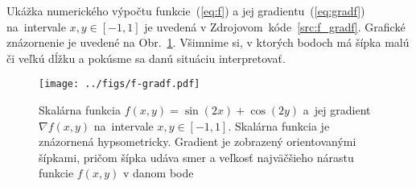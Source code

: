 \documentclass[a4paper, 12pt]{book}
\begin{document}
Ukážka numerického výpočtu funkcie~(\ref{eq:f}) a jej 
gradientu~(\ref{eq:gradf}) na~intervale $x, y \in [-1, 1]$ je uvedená 
v Zdrojovom~kóde~\ref{src:f_gradf}.  Grafické znázornenie je uvedené na 
Obr.~\ref{fig:f_gradf}.  Všimnime si, v ktorých bodoch má šípka malú či veľkú 
dĺžku a pokúsme sa danú situáciu interpretovať.



\begin{figure}[bt]
\centering
\texttt{[image: ../figs/f-gradf.pdf]}
\caption{Skalárna funkcia $f(x, y) = \sin(2x) + \cos(2y)$ a~jej gradient 
$\nabla f(x, y)$ na~intervale $x, y \in [-1, 1]$.  Skalárna funkcia je 
znázornená hypsometricky.  Gradient je zobrazený orientovanými šípkami, pričom 
šípka udáva smer a veľkosť najväčšieho nárastu funkcie $f(x, y)$ v danom bode}
\label{fig:f_gradf}
\end{figure}




\end{document}
